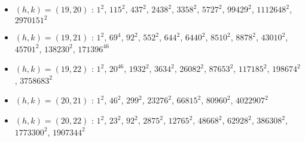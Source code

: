 \begin{itemize}
\item $(h,k)=(19,20)$ : $1^{2}$, $115^{2}$, $437^{2}$, $2438^{2}$, $3358^{2}$, $5727^{2}$, $99429^{2}$, $1112648^{2}$, $2970151^{2}$
\item $(h,k)=(19,21)$ : $1^{2}$, $69^{4}$, $92^{2}$, $552^{2}$, $644^{2}$, $6440^{2}$, $8510^{2}$, $8878^{2}$, $43010^{2}$, $45701^{2}$, $138230^{2}$, $171396^{46}$
\item $(h,k)=(19,22)$ : $1^{2}$, $20^{46}$, $1932^{2}$, $3634^{2}$, $26082^{2}$, $87653^{2}$, $117185^{2}$, $198674^{2}$, $3758683^{2}$
\item $(h,k)=(20,21)$ : $1^{2}$, $46^{2}$, $299^{2}$, $23276^{2}$, $66815^{2}$, $80960^{2}$, $4022907^{2}$
\item $(h,k)=(20,22)$ : $1^{2}$, $23^{2}$, $92^{2}$, $2875^{2}$, $12765^{2}$, $48668^{2}$, $62928^{2}$, $386308^{2}$, $1773300^{2}$, $1907344^{2}$

\end{itemize}
